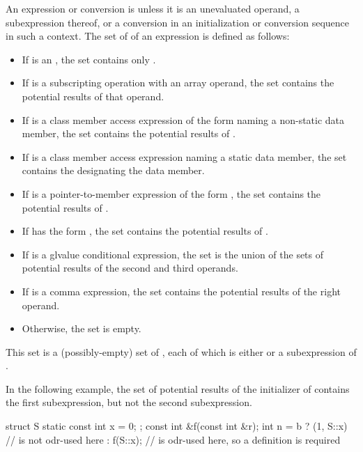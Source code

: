 \pnum
{}%
An expression or conversion is  unless it is
an unevaluated operand,
a subexpression thereof, or
a conversion in an initialization or conversion sequence in such a context.
The set of  of an expression  is
defined as follows:
\begin{itemize}
\item If  is an
, the set
contains only .
\item If  is a subscripting operation with
an array operand, the set contains the potential results of that operand.
\item If  is a class member access
expression of the form
naming a non-static data member,
the set contains the potential results of .
\item If  is a class member access expression
naming a static data member,
the set contains the  designating the data member.
\item If  is a pointer-to-member
expression of the form
,
the set contains the potential results of .
\item If  has the form , the set contains the
potential results of .
\item If  is a glvalue conditional
expression, the set is the union of the sets of
potential results of the second and third operands.
\item If  is a comma expression, the set
contains the potential results of the right operand.
\item Otherwise, the set is empty.
\end{itemize}
\begin{note}
This set is a (possibly-empty) set of ,
each of which is either  or a subexpression of .
\begin{example}
In the following example, the set of potential results of the initializer
of  contains the first  subexpression, but not the second
 subexpression.
\begin{codeblock}
struct S { static const int x = 0; };
const int &f(const int &r);
int n = b ? (1, S::x)           //  is not odr-used here
          : f(S::x);            //  is odr-used here, so a definition is required
\end{codeblock}
\end{example}
\end{note}

